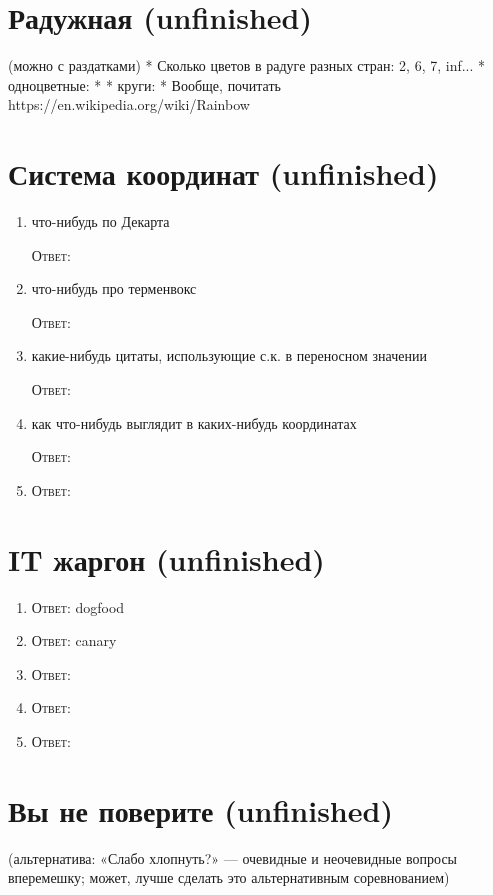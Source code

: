 \documentclass[a4paper,10pt]{article}
\let\keyword\textsc
\newenvironment{topic}{\begin{enumerate}}{\end{enumerate}}
\newcommand{\question}[3]{\item[#1.] #2 \par \keyword{Ответ:} #3}
\begin{document}
\section{Радужная (unfinished)}
(можно с раздатками)
* Сколько цветов в радуге разных стран: 2, 6, 7, inf...
* одноцветные:
*
* круги:
*
Вообще, почитать https://en.wikipedia.org/wiki/Rainbow


\section{Система координат (unfinished)}

\begin{topic}
 \question{??}{что-нибудь по Декарта}{}
 \question{??}{что-нибудь про терменвокс}{}
 \question{??}{какие-нибудь цитаты, использующие с.к. в переносном значении}{}
 \question{??}{как что-нибудь выглядит в каких-нибудь координатах}{}
 \question{??}{}{}
\end{topic}


\section{IT жаргон (unfinished)}

\begin{topic}
 \question{??}{}{dogfood}
 \question{??}{}{canary}
 \question{??}{}{}
 \question{??}{}{}
 \question{??}{}{}
\end{topic}


\section{Вы не поверите (unfinished)}
(альтернатива: «Слабо хлопнуть?» — очевидные и неочевидные вопросы вперемешку; может, лучше сделать это альтернативным соревнованием)
\end{document}

